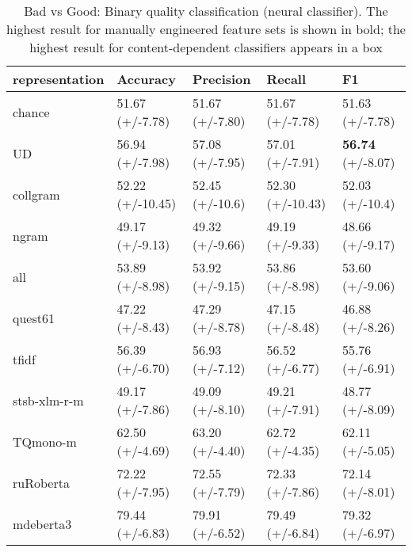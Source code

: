 \begin{table}[H]
	\centering
	\begin{tabular}{l|llll}
		\toprule
		representation & Accuracy         & Precision        & Recall           & F1               \\
		\midrule
		chance          & 51.67 (+/-7.78)  & 51.67 (+/-7.80)  & 51.67 (+/-7.78)  & 51.63 (+/-7.78)  \\
		\midrule
		UD              & 56.94 (+/-7.98)  & 57.08 (+/-7.95)  & 57.01 (+/-7.91)  & \textbf{56.74} (+/-8.07)  \\
		collgram        & 52.22 (+/-10.45) & 52.45 (+/-10.6) & 52.30 (+/-10.43) & 52.03 (+/-10.4) \\
		ngram           & 49.17 (+/-9.13)  & 49.32 (+/-9.66)  & 49.19 (+/-9.33)  & 48.66 (+/-9.17)  \\
		all             & 53.89 (+/-8.98)  & 53.92 (+/-9.15)  & 53.86 (+/-8.98)  & 53.60 (+/-9.06)  \\
		quest61 		& 47.22 (+/-8.43) & 47.29 (+/-8.78) & 47.15 (+/-8.48) & 46.88 (+/-8.26)  \\
		\midrule
		tfidf           & 56.39 (+/-6.70)  & 56.93 (+/-7.12)  & 56.52 (+/-6.77)  & 55.76 (+/-6.91)  \\
		stsb-xlm-r-m          & 49.17 (+/-7.86)  & 49.09 (+/-8.10)  & 49.21 (+/-7.91)  & 48.77 (+/-8.09)  \\
		TQmono-m        & 62.50 (+/-4.69)  & 63.20 (+/-4.40)  & 62.72 (+/-4.35)  & 62.11 (+/-5.05)  \\
		ruRoberta & 72.22 (+/-7.95)  & 72.55 (+/-7.79)  & 72.33 (+/-7.86)  & 72.14 (+/-8.01)  \\
		mdeberta3  & 79.44 (+/-6.83)  & 79.91 (+/-6.52)  & 79.49 (+/-6.84)  & \boxit{0.4in}79.32 (+/-6.97) \\
		\bottomrule
	\end{tabular}
\caption{\label{tab:bad-good_neu}Bad vs Good: Binary quality classification (neural classifier). The highest result for manually engineered feature sets is shown in bold; the highest result for content-dependent classifiers appears in a box}
\end{table}

